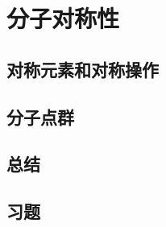 \chapter{分子对称性}
\label{chap:12}
\section{对称元素和对称操作}
\label{sec:12.1 Symmetry Elements and Symmetry Operations}

\section{分子点群}
\label{sec:12.2 Molecular Point Groups}

\section*{总结}

\section*{习题}